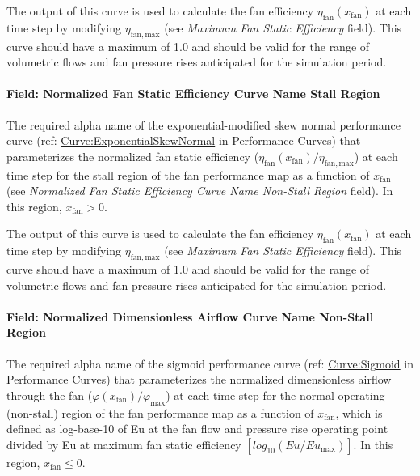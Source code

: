 The output of this curve is used to calculate the fan efficiency \(\eta_{\mathrm{fan}} (x_{\mathrm{fan}})\) at each time step by modifying \(\eta_{\mathrm{fan, max}}\) (see \emph{Maximum Fan Static Efficiency} field). This curve should have a maximum of 1.0 and should be valid for the range of volumetric flows and fan pressure rises anticipated for the simulation period.

\paragraph{Field: Normalized Fan Static Efficiency Curve Name Stall Region}\label{field-normalized-fan-static-efficiency-curve-name-stall-region}

The required alpha name of the exponential-modified skew normal performance curve (ref: \hyperref[curveexponentialskewnormal]{Curve:ExponentialSkewNormal} in Performance Curves) that parameterizes the normalized fan static efficiency (\(\eta_{\mathrm{fan}} (x_{\mathrm{fan}}) / \eta_{\mathrm{fan, max}}\)) at each time step for the stall region of the fan performance map as a function of \(x_{\mathrm{fan}}\) (see \emph{Normalized Fan Static Efficiency Curve Name Non-Stall Region} field). In this region, \(x_{\mathrm{fan}} > 0\).

The output of this curve is used to calculate the fan efficiency \(\eta_{\mathrm{fan}} ( x_{\mathrm{fan}} )\) at each time step by modifying \(\eta_{\mathrm{fan, max}}\) (see \emph{Maximum Fan Static Efficiency} field). This curve should have a maximum of 1.0 and should be valid for the range of volumetric flows and fan pressure rises anticipated for the simulation period.

\paragraph{Field: Normalized Dimensionless Airflow Curve Name Non-Stall Region}\label{field-normalized-dimensionless-airflow-curve-name-non-stall-region}

The required alpha name of the sigmoid performance curve (ref: \hyperref[curvesigmoid]{Curve:Sigmoid} in Performance Curves) that parameterizes the normalized dimensionless airflow through the fan (\(\varphi (x_{\mathrm{fan}}) / \varphi_{\mathrm{max}}\)) at each time step for the normal operating (non-stall) region of the fan performance map as a function of \(x_{\mathrm{fan}}\), which is defined as log-base-10 of Eu at the fan flow and pressure rise operating point divided by Eu at maximum fan static efficiency \([log_{10}(Eu / Eu_{\mathrm{max}})]\). In this region, \(x_{\mathrm{fan}} \le 0\).

